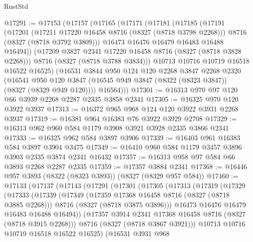 \begin{lexlean}{RustStd}
\begin{coremodule}
@17291 := @17153
    (@17157
      (@17165
        (@17171
          (@17181
            (@17185
              (@17191
                (@17201
                  (@17211 @17220 @16458 @8716 (@8327 (@8718 @3798 @2268)))
                  @8716
                  (@8327 (@8718 @3792 @3809)))
                @16473
                @16476
                @16479
                @16483
                @16488
                @16494))
            (@17209 @3827 @2341 @17220 @16458 @8716 (@8327 (@8718 @3828 @2268)))
            @8716
            (@8327 (@8718 @3788 @3834)))
          @10713
          @10716
          @10719
          @16518
          @16522
          @16525)
        (@16531
          @3844
          @950
          @124
          @120
          @2268
          @3847
          @2268
          @2320
          (@16541
            @950
            @120
            @3847
            (@16545 @949 @3847 (@8322 (@8323 @3847)) (@8327 (@8329 @949 @120))))
          @16564)))
@17301 := @16313 @970 @97 @120 @66 @3939 @2268 @2287 @2335 @3858 @2341
@17305 := @16325 @970 @120 @3922 @3937
@17313 := @16372 @965 @968 @124 @120 @3922 @3931 @2268 @3937
@17319 := @16381 @964 @16383 @76 @3922 @3929 @2708
@17329 := @16313 @962 @960 @584 @1179 @3908 @3921 @3928 @2335 @3866 @2341
@17333 := @16325 @962 @584 @3897 @3906
@17339 := @16403 @961 @16383 @584 @3897 @3904 @3475
@17349 := @16410 @960 @584 @1179 @3457 @3896 @3903 @2335 @3874 @2341 @16432
@17357 := @16313 @958 @97 @584 @66 @3893 @2268 @2287 @2335
@17359 := @17357 @3884 @2341
@17368 := @16446 @957 @3893 (@8322 (@8323 @3893)) (@8327 (@8329 @957 @584))
@17460 := @17133
    (@17137
      (@17143
        (@17291
          (@17301
            (@17305
              (@17313
                (@17319
                  (@17329
                    (@17333
                      (@17339
                        (@17349
                          (@17359 @17368 @16458 @8716 (@8327 (@8718 @3885 @2268)))
                          @8716
                          (@8327 (@8718 @3875 @3896)))
                        @16473
                        @16476
                        @16479
                        @16483
                        @16488
                        @16494))
                    (@17357 @3914 @2341 @17368 @16458 @8716 (@8327 (@8718 @3915 @2268)))
                    @8716
                    (@8327 (@8718 @3867 @3921)))
                  @10713
                  @10716
                  @10719
                  @16518
                  @16522
                  @16525)
                (@16531
                  @3931
                  @968

\end{coremodule}
\end{lexlean}
